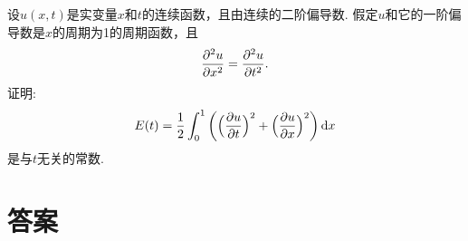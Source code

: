 \documentclass[openany,usenames,dvipsnames]{ctexbook}
\begin{document}
\begin{example}
  设$u(x,t)$是实变量$x$和$t$的连续函数，且由连续的二阶偏导数. 假定$u$和它的一阶偏导数是$x$的周期为1的周期函数，且
  \[
    \frac{\partial^2 u}{\partial x^2} = \frac{\partial^2 u}{\partial t^2}.
  \]
  证明:
  \[
    E(t) = \frac12\int_0^1\bigg(
      \Big( \frac{\partial u}{\partial t} \Big)^2 + 
      \Big( \frac{\partial u}{\partial x} \Big)^2
    \bigg)\,\mathrm dx
  \]
  是与$t$无关的常数.
\end{example}


\part{答案}

\setcounter{chapter}{1}
\end{document}
